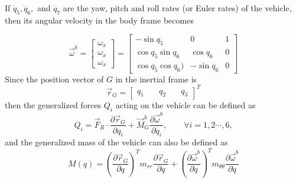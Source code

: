 \documentclass[twocolumn,10pt]{asme2e}
\begin{document}
{%
%


 If $\dot{q}_5, \dot{q}_6,$ and $\dot{q}_7$ are the yaw, pitch and roll rates (or Euler rates)  of the vehicle, then its angular velocity in the body frame becomes
 
 \begin{equation}
 	\vec{\omega}^b=\left[\begin{array}{c}
 		\omega_{x}\\
 		\omega_{x}\\
 		\omega_{x}
 	\end{array}\right]=\left[\begin{array}{ccc} -\sin{q}_{5} & 0 & 1\\ \cos{q}_{5}\sin{q}_{6} & \cos{q}_{6} & 0\\ \cos{q}_{5}\cos{q}_{6}) &-\sin{q}_{6} & 0 \end{array}\right]\end{equation}
Since the position vector of $G$ in the inertial frame is 
\begin{equation}
	\vec{r}_{G}= \left[\begin{array}{ccc}
		q_1&\quad
		q_2&\quad
		q_3
	\end{array}\right]^T
\end{equation}
then the generalized forces $Q_{i}$ acting on the vehicle can be defined  as
\begin{equation}
Q_{i}=\vec{F}_{R}\cdot\frac{\partial\vec{r}_{G}}{\partial q_{i}}+\vec{M}_{G}^b\frac{\partial\vec{\omega}^b}{\partial\dot{q_{i}}}, \qquad \forall i=1,2\cdots, 6,\end{equation}
and the generalized mass of the vehicle can also be defined as
\begin{equation}
M(q)=\left(\frac{\partial\vec{r}_{G}}{\partial q}\right)^{T}m_{rr}\frac{\partial\vec{r}_{G}}{\partial q}+\left(\frac{\partial\vec{\omega}^b}{\partial\dot{q}}\right)^{T}m_{\theta\theta}\frac{\partial\vec{\omega}^b}{\partial\dot{q}}
\end{equation}

}
\end{document}
